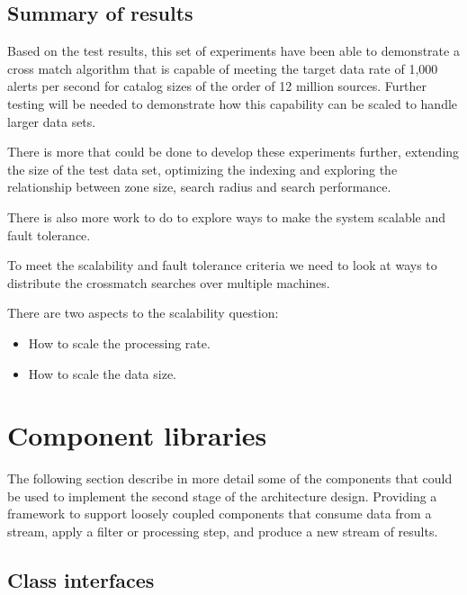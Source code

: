 \documentclass{article}
\begin{document}
\subsection{Summary of results}
\label{crossmatch-summary}

Based on the test results, this set of experiments have been able to demonstrate a cross match algorithm that is capable of meeting the target data rate of 1,000 alerts per second for catalog sizes of the order of 12 million sources. Further testing will be needed to demonstrate how this capability can be scaled to handle larger data sets.

There is more  that could be done to develop these experiments further, extending the size of the test data set, optimizing the indexing and exploring the relationship between zone size, search radius and search performance.

There is also more work to do to explore ways to make the system scalable and fault tolerance.

To meet the scalability and fault tolerance criteria we need to look at ways to distribute the crossmatch searches over multiple machines.

There are two aspects to the scalability question:
\begin{itemize}
    \item How to scale the processing rate.
    \item How to scale the data size.
\end{itemize}{}















\section{Component libraries}
\label{component-libraries}

The following section describe in more detail some of the components that could be used to implement the second stage of the architecture design. Providing a framework to support loosely coupled components that consume data from a stream, apply a filter or processing step, and produce a new stream of results.

\subsection{Class interfaces}
\label{component-libraries.java-interfaces}
\end{document}
